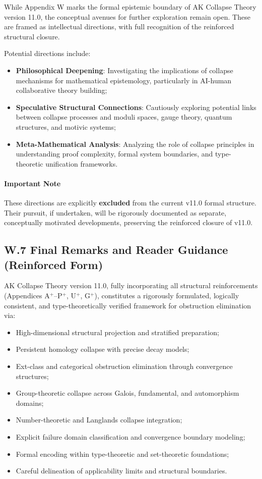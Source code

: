 \documentclass[11pt]{article}
\begin{document}
While Appendix W marks the formal epistemic boundary of AK Collapse Theory version 11.0, the conceptual avenues for further exploration remain open. These are framed as intellectual directions, with full recognition of the reinforced structural closure.

Potential directions include:

\begin{itemize}
    \item \textbf{Philosophical Deepening}: Investigating the implications of collapse mechanisms for mathematical epistemology, particularly in AI-human collaborative theory building;
    \item \textbf{Speculative Structural Connections}: Cautiously exploring potential links between collapse processes and moduli spaces, gauge theory, quantum structures, and motivic systems;
    \item \textbf{Meta-Mathematical Analysis}: Analyzing the role of collapse principles in understanding proof complexity, formal system boundaries, and type-theoretic unification frameworks.
\end{itemize}

\paragraph{Important Note}  
These directions are explicitly \textbf{excluded} from the current v11.0 formal structure. Their pursuit, if undertaken, will be rigorously documented as separate, conceptually motivated developments, preserving the reinforced closure of v11.0.

\subsection*{W.7 Final Remarks and Reader Guidance (Reinforced Form)}

AK Collapse Theory version 11.0, fully incorporating all structural reinforcements (Appendices A$^{+}$–P$^{+}$, U$^{+}$, G$^{+}$), constitutes a rigorously formulated, logically consistent, and type-theoretically verified framework for obstruction elimination via:

\begin{itemize}
    \item High-dimensional structural projection and stratified preparation;
    \item Persistent homology collapse with precise decay models;
    \item Ext-class and categorical obstruction elimination through convergence structures;
    \item Group-theoretic collapse across Galois, fundamental, and automorphism domains;
    \item Number-theoretic and Langlands collapse integration;
    \item Explicit failure domain classification and convergence boundary modeling;
    \item Formal encoding within type-theoretic and set-theoretic foundations;
    \item Careful delineation of applicability limits and structural boundaries.
\end{itemize}
\end{document}
